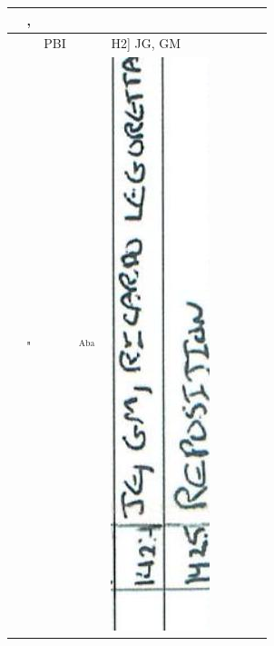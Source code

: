 \documentclass[10pt]{article}
\begin{document}
\begin{center}
\begin{tabular}{|c|c|c|c|c|c|c|c|c|c|c|}
{} & , &  &  &  \\
\hline
 &  & PBI &  & \multicolumn{3}{|l|}{H2] JG, GM} &  &  &  &  \\
\hline
 & " &  & \({ }^{\text {Aba }}\) & \multicolumn{3}{|l|}{\multirow[t]{2}{*}{\includegraphics[max width=\textwidth]{2025_02_27_dd68c3d38de88f0516d9g-082(1)}
}}
\end{tabular}
\end{center}
\end{document}
